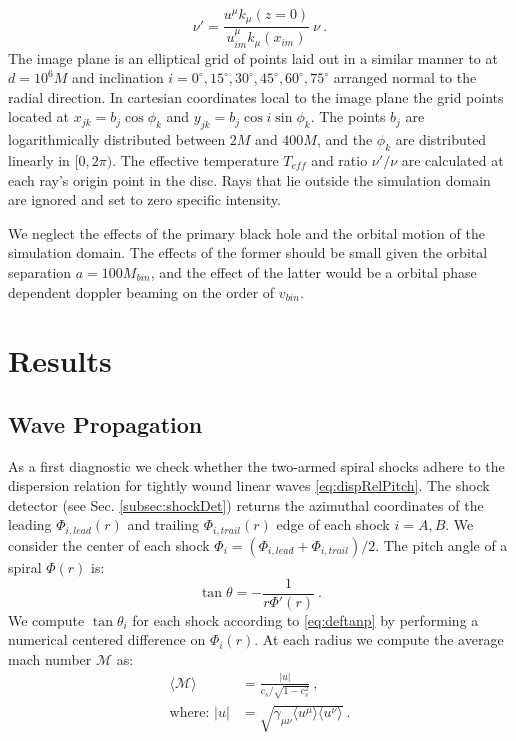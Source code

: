 \documentclass{emulateapj}
\begin{document}
\begin{equation}
	\nu' = \frac{u^\mu k_\mu(z=0)}{u^\mu_{im} k_\mu(x_{im})} \ \nu \ .
\end{equation}
The image plane is an elliptical grid of points laid out in a similar manner to \cite{Kulkarni11} at $d=10^6M$ and inclination $i = 0^\circ, 15^\circ, 30^\circ, 45^\circ, 60^\circ, 75^\circ$ arranged normal to the radial direction.  In cartesian coordinates local to the image plane the grid points located at $x_{jk} = b_j \cos \phi_k$ and $y_{jk} = b_j \cos i \sin \phi_k$.  The points $b_j$ are logarithmically distributed between $2M$ and $400M$, and the  $\phi_k$ are distributed linearly in $[0, 2\pi)$. The effective temperature $T_{eff}$ and ratio $\nu' / \nu$ are calculated at each ray's origin point in the disc.  Rays that lie outside the simulation domain are ignored and set to zero specific intensity.

We neglect the effects of the primary black hole and the orbital motion of the simulation domain.  The effects of the former should be small given the orbital separation $a = 100M_{bin}$, and the effect of the latter would be a orbital phase dependent doppler beaming on the order of $v_{bin}$.



\section{Results}
\label{sec:results}

\subsection{Wave Propagation}
\label{subsec:res-prop}

As a first diagnostic we check whether the two-armed spiral shocks adhere to the dispersion relation for tightly wound linear waves \eqref{eq:dispRelPitch}.  The shock detector (see Sec. \ref{subsec:shockDet}) returns the azimuthal coordinates of the leading $\Phi_{i,lead}(r)$ and trailing $\Phi_{i,trail}(r)$ edge of each shock $i=A,B$.  We consider the center of each shock $\Phi_i = (\Phi_{i,lead} + \Phi_{i,trail}) / 2$.  The pitch angle of a spiral $\Phi(r)$ is:
\begin{equation}
	\tan \theta = -\frac{1}{r \Phi'(r)} \ . \label{eq:deftanp} 
\end{equation}
We compute $\tan \theta_i$ for each shock according to \eqref{eq:deftanp} by performing a numerical centered difference on $\Phi_i(r)$.  At each radius we compute the average mach number $\mathcal{M}$ as:
\begin{align}
	\langle \mathcal{M} \rangle &=  \frac{|u|}{c_s / \sqrt{1-c_s^2}} \ , \\
	\text{where: } |u| &= \sqrt{\gamma_{\mu\nu} \langle u^\mu \rangle  \langle u^\nu \rangle} \nonumber \ .
\end{align}
\end{document}
